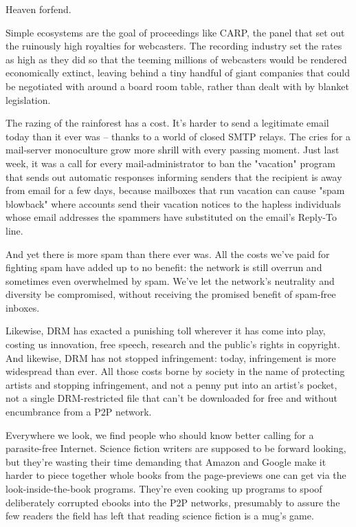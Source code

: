 Heaven forfend.

Simple ecosystems are the goal of proceedings like CARP, the panel
that set out the ruinously high royalties for webcasters. The
recording industry set the rates as high as they did so that the
teeming millions of webcasters would be rendered economically
extinct, leaving behind a tiny handful of giant companies that
could be negotiated with around a board room table, rather than
dealt with by blanket legislation.

The razing of the rainforest has a cost. It's harder to send a
legitimate email today than it ever was -- thanks to a world of
closed SMTP relays. The cries for a mail-server monoculture grow
more shrill with every passing moment. Just last week, it was a
call for every mail-administrator to ban the "vacation" program
that sends out automatic responses informing senders that the
recipient is away from email for a few days, because mailboxes that
run vacation can cause "spam blowback" where accounts send their
vacation notices to the hapless individuals whose email addresses
the spammers have substituted on the email's Reply-To line.

And yet there is more spam than there ever was. All the costs we've
paid for fighting spam have added up to no benefit: the network is
still overrun and sometimes even overwhelmed by spam. We've let the
network's neutrality and diversity be compromised, without
receiving the promised benefit of spam-free inboxes.

Likewise, DRM has exacted a punishing toll wherever it has come
into play, costing us innovation, free speech, research and the
public's rights in copyright. And likewise, DRM has not stopped
infringement: today, infringement is more widespread than ever. All
those costs borne by society in the name of protecting artists and
stopping infringement, and not a penny put into an artist's pocket,
not a single DRM-restricted file that can't be downloaded for free
and without encumbrance from a P2P network.

Everywhere we look, we find people who should know better calling
for a parasite-free Internet. Science fiction writers are supposed
to be forward looking, but they're wasting their time demanding
that Amazon and Google make it harder to piece together whole books
from the page-previews one can get via the look-inside-the-book
programs. They're even cooking up programs to spoof deliberately
corrupted ebooks into the P2P networks, presumably to assure the
few readers the field has left that reading science fiction is a
mug's game.

